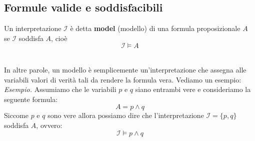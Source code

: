 \subsection{Formule valide e soddisfacibili}
 \colorbox{SALZO}{\parbox{\dimexpr\linewidth-2\fboxsep}{\begin{definition}
   Un interpretazione $\mathcal{I}$ è detta \textbf{model} (modello) di una formula proposizionale $A$ se $\mathcal{I}$ soddisfa $A$, cioè
   \[    \mathcal{I} \models A  \]
\end{definition}}}\smallskip\\
In altre parole, un modello è semplicemente un'interpretazione che assegna alle variabili valori di verità tali da rendere la formula vera. Vediamo un esempio:\\
\textit{Esempio.} Assumiamo che le variabili $p$ e $q$ siano entrambi vere e consideriamo la seguente formula:
\[A = p \wedge q\]
Siccome $p$ e $q$ sono vere allora possiamo dire che l'interpretazione $\mathcal{I} = \{  p,q  \}$ soddisfa $A$, ovvero:
\[\mathcal{I} \models p \wedge q\]

